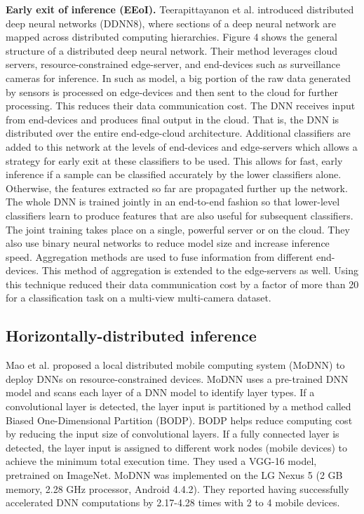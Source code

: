 \documentclass[letterpaper, 10 pt, conference]{ieeeconf}
\begin{document}
\textbf{Early exit of inference (EEoI).} Teerapittayanon et al. introduced distributed deep neural networks (DDNN8), where sections of a deep neural network are mapped across distributed computing hierarchies\cite{Teerapittayanon_McDanel_Kung_2017}. Figure 4 shows the general structure of a distributed deep neural network. Their method leverages cloud servers, resource-constrained edge-server, and end-devices such as surveillance cameras for inference. In such as model, a big portion of the raw data generated by sensors is processed on edge-devices and then sent to the cloud for further processing. This reduces their data communication cost. The DNN receives input from end-devices and produces final output in the cloud. That is, the DNN is distributed over the entire end-edge-cloud architecture. Additional classifiers are added to this network at the levels of end-devices and edge-servers which allows a strategy for early exit at these classifiers to be used. This allows for fast, early inference if a sample can be classified accurately by the lower classifiers alone. Otherwise, the features extracted so far are propagated further up the network. The whole DNN is trained jointly in an end-to-end fashion so that lower-level classifiers learn to produce features that are also useful for subsequent classifiers. The joint training takes place on a single, powerful server or on the cloud. They also use binary neural networks\cite{Courbariaux_Hubara_Soudry_El-Yaniv_Bengio_2016} to reduce model size and increase inference speed. Aggregation methods are used to fuse information from different end-devices. This method of aggregation is extended to the edge-servers as well. Using this technique reduced their data communication cost by a factor of more than 20 for a classification task on a multi-view multi-camera dataset.
\subsection{Horizontally-distributed inference}
Mao et al. proposed a local distributed mobile computing system (MoDNN) to deploy DNNs on resource-constrained devices\cite{Mao_Chen_Nixon_Krieger_Chen_2017}. MoDNN uses a pre-trained DNN model and scans each layer of a DNN model to identify layer types. If a convolutional layer is detected, the layer input is partitioned by a method called Biased One-Dimensional Partition (BODP). BODP helps reduce computing cost by reducing the input size of convolutional layers. If a fully connected layer is detected, the layer input is assigned to different work nodes (mobile devices) to achieve the minimum total execution time. They used a VGG-16 model, pretrained on ImageNet. MoDNN was implemented on the LG Nexus 5 (2 GB memory, 2.28 GHz processor, Android 4.4.2). They reported having successfully accelerated DNN computations by 2.17-4.28 times with 2 to 4 mobile devices.
\end{document}

